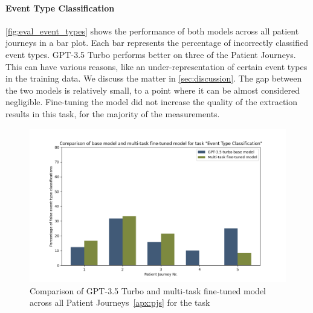 \newpage
\paragraph{Event Type Classification} \autoref{fig:eval_event_types} shows the performance of both models across all patient journeys in a bar plot. Each bar represents the percentage of incorrectly classified event types. GPT-3.5 Turbo performs better on three of the Patient Journeys. This can have various reasons, like an under-representation of certain event types in the training data. We discuss the matter in \autoref{sec:discussion}. The gap between the two models is relatively small, to a point where it can be almost considered negligible. Fine-tuning the model did not increase the quality of the extraction results in this task, for the majority of the measurements.
\begin{figure}[ht]
    \centering
    \captionsetup{belowskip=0pt,aboveskip=0pt}
    \includegraphics[width=\textwidth]{bachelor_thesis/images/event_types_all.png}
    \caption{Comparison of GPT-3.5 Turbo and multi-task fine-tuned model across all Patient Journeys~\ref{apx:pjs} for the task }
    \label{fig:eval_event_types}
\end{figure}


